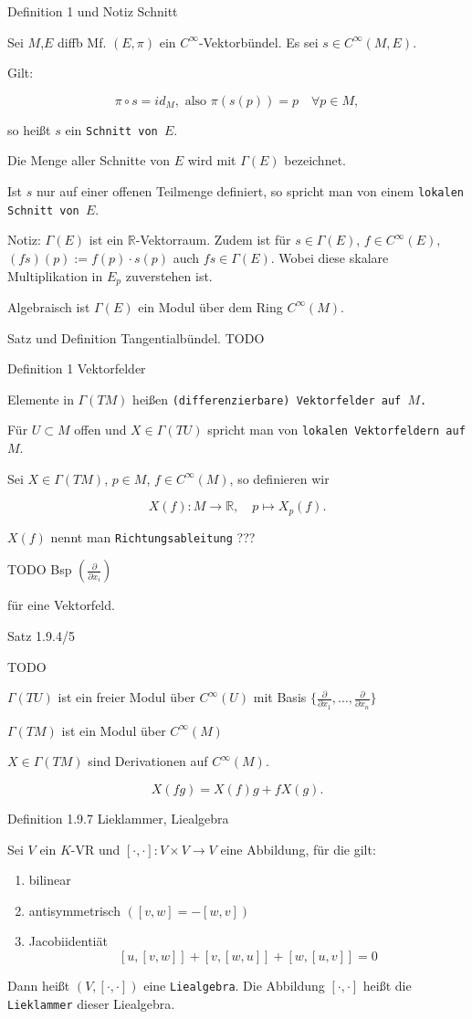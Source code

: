 \documentclass[a6paper,11pt,grid=front]{kartei}
\newcommand{\fl}[1]{\begin{flushleft}
 #1 \end{flushleft}}
\newcommand{\R}{\mathbb{R}}
\newcounter{def}
\begin{document}
\nonameyet
{Definition 1 und Notiz} {Schnitt}
{
	\small
Sei $M$,$E$ diffb Mf. $(E,\pi)$ ein $C^\infty$-Vektorbündel. 
Es sei $s \in C^\infty(M,E)$.

\fl{Gilt:}
\[
\pi \circ s = id_M, \text{ also }
\pi(s(p)) = p \quad \forall p \in M,
\]

\fl{so heißt $s$ ein \texttt{Schnitt von $E$}.}
\fl{Die Menge aller Schnitte von $E$ wird mit $\Gamma(E)$ bezeichnet.}
\fl{Ist $s$ nur auf einer offenen Teilmenge definiert, so spricht man von
einem \texttt{lokalen Schnitt von $E$}.}

\fl{Notiz: $\Gamma(E)$ ist ein $\R$-Vektorraum. Zudem ist für $s \in \Gamma(E)$,
$f\in C^\infty(E)$, $(fs)(p) := f(p)\cdot s(p)$ auch $fs \in \Gamma(E)$. Wobei 
diese skalare Multiplikation in $E_p$ zuverstehen ist. 
\par
Algebraisch ist $\Gamma(E)$ ein Modul über dem Ring $C^\infty(M)$.
}
}
{}

\nonameyet
{Satz und Definition} {Tangentialbündel.}
{
TODO
}
{}


\nonameyet
{Definition 1} {Vektorfelder}
{
Elemente in $\Gamma(TM)$ heißen \texttt{(differenzierbare) Vektorfelder auf $M$.}
\fl{Für $U \subset M$ offen und $X\in \Gamma(TU)$ spricht man von 
\texttt{lokalen Vektorfeldern auf $M$}.}
\fl{Sei $X\in \Gamma(TM)$, $p\in M$, $f\in C^\infty(M)$, so definieren wir }
\[
X(f) : M \to \R, \quad p \mapsto X_p(f).
\]
\fl{$X(f)$ nennt man \texttt{Richtungsableitung} ???}
\fl{TODO Bsp $(\frac{\partial}{\partial x_i})$} für eine Vektorfeld.
}
{}

\nonameyet
{Satz 1.9.4/5} {}
{
TODO
\\
\fl{$\Gamma(TU)$ ist ein freier Modul über $C^\infty(U)$ mit Basis
$\{\frac{\partial}{\partial x_1},\dots,\frac{\partial}{\partial x_n}\}$}
\fl{$\Gamma(TM)$ ist ein Modul über $C^\infty(M)$}
\fl{$X\in \Gamma(TM)$ sind Derivationen auf $C^\infty(M)$.}
\[
X(fg) = X(f)g + fX(g).
\]
}
{}

\nonameyet
{Definition 1.9.7} {Lieklammer, Liealgebra}
{
Sei $V$ ein $K$-VR und $[\cdot,\cdot]: V\times V \to V$ eine Abbildung,
für die gilt:
\begin{enumerate}[1.]
\item bilinear
\item antisymmetrisch $([v,w] = - [w,v])$
\item Jacobiidentiät
\[
[u,[v,w]] + [v,[w,u]] + [w,[u,v]] = 0
\]
\end{enumerate}
\fl{Dann heißt $(V,[\cdot,\cdot])$ eine \texttt{Liealgebra}. Die Abbildung 
$[\cdot,\cdot]$ heißt die \texttt{Lieklammer} dieser Liealgebra.}
}
{}
\end{document}
